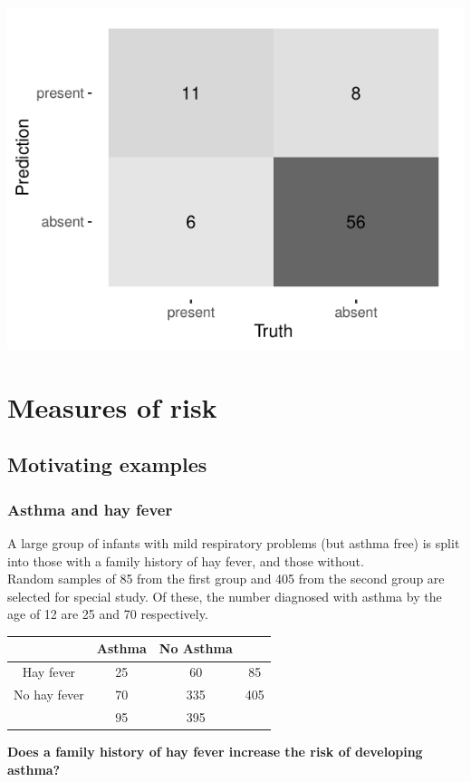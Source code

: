 \documentclass[a4paper]{article}\usepackage[]{graphicx}\usepackage[]{xcolor}
\makeatletter
\def\maxwidth{ %
  \ifdim\Gin@nat@width>\linewidth
    \linewidth
  \else
    \Gin@nat@width
  \fi
}
\makeatother
\begin{document}
\begin{Schunk}
{\centering \includegraphics[width=\maxwidth]{figure/listings-unnamed-chunk-39-1} 

}

\end{Schunk}


\section{Measures of risk}\label{sec:6}
\subsection{Motivating examples}
\subsubsection{Asthma and hay fever}
A large group of infants with mild respiratory problems (but asthma free) is split into those with a family history of hay fever, and those without.\\
Random samples of 85 from the first group and 405 from the second group are selected for special study. Of these, the number diagnosed with asthma by the age of 12 are 25 and 70 respectively.
\begin{table}[H]
	\centering
	\begin{tabular}{@{}ccc|c@{}}
	\toprule
				 & Asthma & No Asthma &     \\ \midrule
	Hay fever    & 25    & 60        & 85  \\
	No hay fever & 70    & 335       & 405 \\ \midrule
				 & 95    & 395       &     \\ \bottomrule
	\end{tabular}
\end{table}
\begin{greenbox}
	\textbf{Does a family history of hay fever increase the risk of developing asthma?}
\end{greenbox}
\end{document}
